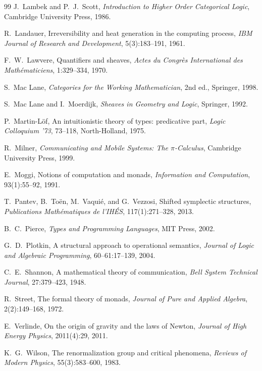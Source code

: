 \documentclass[12pt,a4paper]{article}
\theoremstyle{definition}
\theoremstyle{remark}
\begin{document}
\begin{thebibliography}{99}
J.~Lambek and P.~J.~Scott, \emph{Introduction to Higher Order Categorical Logic},
Cambridge University Press, 1986.

R.~Landauer, Irreversibility and heat generation in the computing process,
\emph{IBM Journal of Research and Development}, 5(3):183--191, 1961.

F.~W.~Lawvere, Quantifiers and sheaves,
\emph{Actes du Congr\`es International des Math\'ematiciens}, 1:329--334, 1970.

S.~Mac Lane, \emph{Categories for the Working Mathematician}, 2nd ed., Springer, 1998.

S.~Mac Lane and I.~Moerdijk, \emph{Sheaves in Geometry and Logic}, Springer, 1992.

P.~Martin-L\"of, An intuitionistic theory of types: predicative part,
\emph{Logic Colloquium '73}, 73--118, North-Holland, 1975.

R.~Milner, \emph{Communicating and Mobile Systems: The $\pi$-Calculus},
Cambridge University Press, 1999.

E.~Moggi, Notions of computation and monads,
\emph{Information and Computation}, 93(1):55--92, 1991.

T.~Pantev, B.~To\"en, M.~Vaqui\'e, and G.~Vezzosi, Shifted symplectic structures,
\emph{Publications Math\'ematiques de l'IH\'ES}, 117(1):271--328, 2013.

B.~C.~Pierce, \emph{Types and Programming Languages}, MIT Press, 2002.

G.~D.~Plotkin, A structural approach to operational semantics,
\emph{Journal of Logic and Algebraic Programming}, 60--61:17--139, 2004.

C.~E.~Shannon, A mathematical theory of communication,
\emph{Bell System Technical Journal}, 27:379--423, 1948.

R.~Street, The formal theory of monads,
\emph{Journal of Pure and Applied Algebra}, 2(2):149--168, 1972.

E.~Verlinde, On the origin of gravity and the laws of Newton,
\emph{Journal of High Energy Physics}, 2011(4):29, 2011.

K.~G.~Wilson, The renormalization group and critical phenomena,
\emph{Reviews of Modern Physics}, 55(3):583--600, 1983.

\end{thebibliography}
\end{document}
